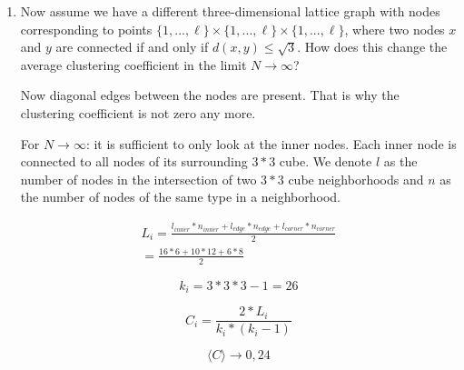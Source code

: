 \begin{enumerate}
	\item Now assume we have a different three-dimensional lattice graph with nodes corresponding to points $\{1,...,\ell\}\times\{1,...,\ell\}\times\{1,...,\ell\}$, where two nodes $x$ and $y$ are connected if and only if $d(x,y) \leq \sqrt{3}$. How does this change the average clustering coefficient in the limit $N \rightarrow \infty$?
	\vspace{0.25cm}
	
	Now diagonal edges between the nodes are present. That is why the clustering coefficient is not zero any more.
	
	For $N \rightarrow \infty$: it is sufficient to only look at the inner nodes. Each inner node is connected to all nodes of its surrounding $3*3$ cube. We denote $l$ as the number of nodes in the intersection of two $3*3$ cube neighborhoods and $n$ as the number of nodes of the same type in a neighborhood. 
	
	\begin{align*}
		L_i = \frac{l_{inner}*n_{inner} + l_{edge}*n_{edge} + l_{corner}*n_{corner}}{2} \\
		= \frac{16*6 + 10*12 + 6*8}{2}
	\end{align*}
	
	\begin{equation*}
		k_i = 3*3*3-1 = 26
	\end{equation*}
	
	\begin{equation*}
		C_i = \frac{2*L_i}{k_i * (k_i-1)}
	\end{equation*}
	
	\begin{equation*}
		\langle C \rangle \rightarrow 0,24
	\end{equation*}
	
\end{enumerate}